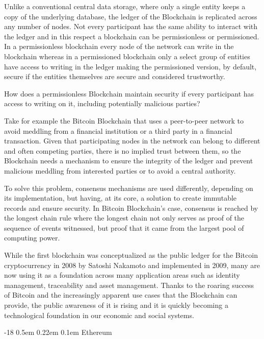 \documentclass[]{llncs}
\makeatletter
\renewcommand\subsubsection{\@startsection{subsubsection}{3}{\z@}%
                       {-18\p@ \@plus -4\p@ \@minus -4\p@}%
                       {0.5em \@plus 0.22em \@minus 0.1em}%
                       {\normalfont\normalsize\bfseries\boldmath}}
\makeatother
\begin{document}
Unlike a conventional central data storage, where only a single entity keeps a copy of the 
underlying database, the ledger of the Blockchain is replicated across any number of nodes. 
Not every participant has the same ability to interact with the ledger and in this respect 
a blockchain can be permissionless or permissioned. In a permissionless blockchain every node of 
the network can write in the blockchain whereas in a permissioned blockchain only a select group 
of entities have access to writing in the ledger making the permissioned version, by default, 
secure if the entities themselves are secure and considered trustworthy.

How does a permissionless Blockchain maintain security if every participant has access to 
writing on it, including potentially malicious parties?

Take for example the Bitcoin Blockchain that uses a peer-to-peer network to avoid meddling 
from a financial institution or a third party in a financial transaction. Given that participating 
nodes in the network can belong to different and often competing parties, there is no implied trust 
between them, so the Blockchain needs a mechanism to ensure the integrity of the ledger and prevent 
malicious meddling from interested parties or to avoid a central authority.\cite{Barclay2017}

To solve this problem, consensus mechanisms are used differently, depending on its implementation, 
but having, at its core, a solution to create immutable records and ensure security. 
In Bitcoin Blockchain’s case, consensus is reached by the longest chain rule where the 
longest chain not only serves as proof of the sequence of events witnessed, 
but proof that it came from the largest pool of computing power.\cite{Baars2016}

While the first blockchain was conceptualized as the public ledger for the Bitcoin cryptocurrency 
in 2008 by Satoshi Nakamoto and implemented in 2009, many are now using it as a foundation across 
many application areas such as identity management, traceability and asset management. 
Thanks to the roaring success of Bitcoin and the increasingly apparent use cases that the 
Blockchain can provide, the public awareness of it is rising and it is quickly becoming a 
technological foundation in our economic and social systems.

\subsubsection{Ethereum}
\end{document}
